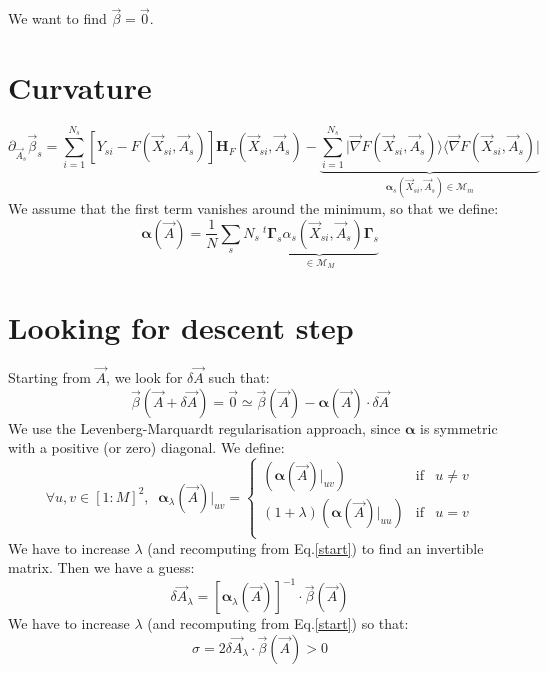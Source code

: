 \documentclass[aps,12pt]{revtex4}
\newcommand{\trn}[1]{~^t{#1}}
\begin{document}
We want to find $\vec{\beta} = \vec{0}$.

\section{Curvature}
\begin{equation}
	\partial_{\vec{A}_s} \vec{\beta}_s = \sum_{i=1}^{N_s}  \left[ Y_{si} - F(\vec{X}_{si},\vec{A}_s) \right] \bm{H}_F(\vec{X}_{si},\vec{A}_s)
	- \underbrace{
	\sum_{i=1}^{N_s} \vert\vec{\nabla} F(\vec{X}_{si},\vec{A}_s) \rangle  \langle\vec{\nabla} F(\vec{X}_{si},\vec{A}_s)\vert
	}_{\bm{\alpha}_s(\vec{X}_{si},\vec{A}_s)\in\mathcal{M}_{m} }
\end{equation}
We assume that the first term vanishes around the minimum, so that we define:
\begin{equation}
	\bm{\alpha}(\vec{A}) = \dfrac{1}{N} \sum_s N_s \underbrace{\trn{\bm{\Gamma}_s} \alpha_s (\vec{X}_{si},\vec{A}_s) \bm{\Gamma}_s}_{\in \mathcal{M}_M}
\end{equation}

\section{Looking for descent step}

Starting from $\vec{A}$, we look for $\delta\vec{A}$ such that:
\begin{equation}
	\vec{\beta}(\vec{A}+\delta\vec{A}) = \vec{0} \simeq \vec{\beta}(\vec{A}) - \bm{\alpha}(\vec{A}) \cdot \delta \vec{A}
\end{equation}
We use the Levenberg-Marquardt regularisation approach, since $\bm{\alpha}$ is symmetric with a positive (or zero) diagonal.
We define:
\begin{equation}
\label{start}
\forall u,v \in [1:M]^2, \;\;
	\bm{\alpha}_{\lambda}(\vec{A})\vert_{uv} = 
	\left\lbrace
	\begin{array}{rcl}
	(\bm{\alpha}(\vec{A})\vert_{uv}) & \text{if} & u\not=v\\
	(1+\lambda)(\bm{\alpha}(\vec{A})\vert_{uu})  & \text{if} & u=v\\
	\end{array}
	\right.
\end{equation}
We have to increase $\lambda$ (and recomputing from Eq.\eqref{start}) to find an invertible matrix.
Then we have a guess:
\begin{equation}
	\delta\vec{A}_\lambda = \left[\bm{\alpha}_\lambda(\vec{A})\right]^{-1} \cdot \vec{\beta}(\vec{A})
\end{equation}
We have to increase $\lambda$ (and recomputing from Eq.\eqref{start}) so that:
\begin{equation}
	\sigma = 2\delta\vec{A}_\lambda \cdot \vec{\beta}(\vec{A}) > 0
\end{equation}
 
\end{document}
